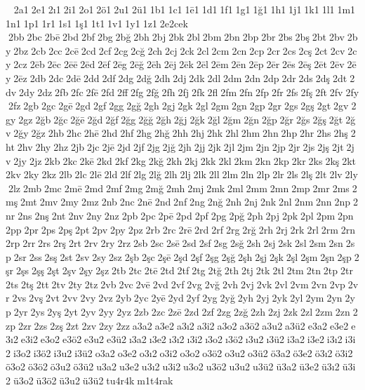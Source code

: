  2a1 2e1 2ı1 2i1 2o1 2ö1 2u1 2ü1 1b1 1c1 1ē1 1d1 1f1 1g1 1ğ1 1h1 1j1 1k1 1l1 1m1 1n1 1p1 1r1 1s1 1ş1 1t1 1v1 1y1 1z1 2e2cek  2bb 2bc 2bē 2bd 2bf 2bg 2bğ 2bh 2bj 2bk 2bl 2bm 2bn 2bp 2br 2bs 2bş 2bt 2bv 2by 2bz 2cb 2cc 2cē 2cd 2cf 2cg 2cğ 2ch 2cj 2ck 2cl 2cm 2cn 2cp 2cr 2cs 2cş 2ct 2cv 2cy 2cz 2ēb 2ēc 2ēē 2ēd 2ēf 2ēg 2ēğ 2ēh 2ēj 2ēk 2ēl 2ēm 2ēn 2ēp 2ēr 2ēs 2ēş 2ēt 2ēv 2ēy 2ēz 2db 2dc 2dē 2dd 2df 2dg 2dğ 2dh 2dj 2dk 2dl 2dm 2dn 2dp 2dr 2ds 2dş 2dt 2dv 2dy 2dz 2fb 2fc 2fē 2fd 2ff 2fg 2fğ 2fh 2fj 2fk 2fl 2fm 2fn 2fp 2fr 2fs 2fş 2ft 2fv 2fy 2fz 2gb 2gc 2gē 2gd 2gf 2gg 2gğ 2gh 2gj 2gk 2gl 2gm 2gn 2gp 2gr 2gs 2gş 2gt 2gv 2gy 2gz 2ğb 2ğc 2ğē 2ğd 2ğf 2ğg 2ğğ 2ğh 2ğj 2ğk 2ğl 2ğm 2ğn 2ğp 2ğr 2ğs 2ğş 2ğt 2ğv 2ğy 2ğz 2hb 2hc 2hē 2hd 2hf 2hg 2hğ 2hh 2hj 2hk 2hl 2hm 2hn 2hp 2hr 2hs 2hş 2ht 2hv 2hy 2hz 2jb 2jc 2jē 2jd 2jf 2jg 2jğ 2jh 2jj 2jk 2jl 2jm 2jn 2jp 2jr 2js 2jş 2jt 2jv 2jy 2jz 2kb 2kc 2kē 2kd 2kf 2kg 2kğ 2kh 2kj 2kk 2kl 2km 2kn 2kp 2kr 2ks 2kş 2kt 2kv 2ky 2kz 2lb 2lc 2lē 2ld 2lf 2lg 2lğ 2lh 2lj 2lk 2ll 2lm 2ln 2lp 2lr 2ls 2lş 2lt 2lv 2ly 2lz 2mb 2mc 2mē 2md 2mf 2mg 2mğ 2mh 2mj 2mk 2ml 2mm 2mn 2mp 2mr 2ms 2mş 2mt 2mv 2my 2mz 2nb 2nc 2nē 2nd 2nf 2ng 2nğ 2nh 2nj 2nk 2nl 2nm 2nn 2np 2nr 2ns 2nş 2nt 2nv 2ny 2nz 2pb 2pc 2pē 2pd 2pf 2pg 2pğ 2ph 2pj 2pk 2pl 2pm 2pn 2pp 2pr 2ps 2pş 2pt 2pv 2py 2pz 2rb 2rc 2rē 2rd 2rf 2rg 2rğ 2rh 2rj 2rk 2rl 2rm 2rn 2rp 2rr 2rs 2rş 2rt 2rv 2ry 2rz 2sb 2sc 2sē 2sd 2sf 2sg 2sğ 2sh 2sj 2sk 2sl 2sm 2sn 2sp 2sr 2ss 2sş 2st 2sv 2sy 2sz 2şb 2şc 2şē 2şd 2şf 2şg 2şğ 2şh 2şj 2şk 2şl 2şm 2şn 2şp 2şr 2şs 2şş 2şt 2şv 2şy 2şz 2tb 2tc 2tē 2td 2tf 2tg 2tğ 2th 2tj 2tk 2tl 2tm 2tn 2tp 2tr 2ts 2tş 2tt 2tv 2ty 2tz 2vb 2vc 2vē 2vd 2vf 2vg 2vğ 2vh 2vj 2vk 2vl 2vm 2vn 2vp 2vr 2vs 2vş 2vt 2vv 2vy 2vz 2yb 2yc 2yē 2yd 2yf 2yg 2yğ 2yh 2yj 2yk 2yl 2ym 2yn 2yp 2yr 2ys 2yş 2yt 2yv 2yy 2yz 2zb 2zc 2zē 2zd 2zf 2zg 2zğ 2zh 2zj 2zk 2zl 2zm 2zn 2zp 2zr 2zs 2zş 2zt 2zv 2zy 2zz a3a2 a3e2 a3ı2 a3i2 a3o2 a3ö2 a3u2 a3ü2 e3a2 e3e2 e3ı2 e3i2 e3o2 e3ö2 e3u2 e3ü2 ı3a2 ı3e2 ı3ı2 ı3i2 ı3o2 ı3ö2 ı3u2 ı3ü2 i3a2 i3e2 i3ı2 i3i2 i3o2 i3ö2 i3u2 i3ü2 o3a2 o3e2 o3ı2 o3i2 o3o2 o3ö2 o3u2 o3ü2 ö3a2 ö3e2 ö3ı2 ö3i2 ö3o2 ö3ö2 ö3u2 ö3ü2 u3a2 u3e2 u3ı2 u3i2 u3o2 u3ö2 u3u2 u3ü2 ü3a2 ü3e2 ü3ı2 ü3i2 ü3o2 ü3ö2 ü3u2 ü3ü2 tu4r4k m1t4rak